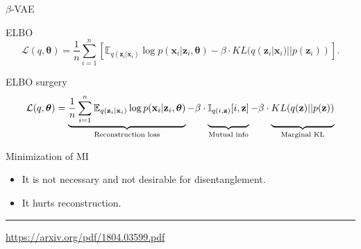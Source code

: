 \documentclass{beamer}
\newcommand{\bx}{\mathbf{x}}
\newcommand{\bz}{\mathbf{z}}
\newcommand{\btheta}{\boldsymbol{\theta}}
\begin{document}
\begin{frame}{$\beta$-VAE}
	\begin{block}{ELBO}
		\vspace{-0.3cm}
		\[
		\mathcal{L}(q, \btheta) = \frac{1}{n} \sum_{i=1}^n \left[ \mathbb{E}_{q(\bz_i | \bx_i)} \log p(\bx_i | \bz_i, \btheta) - \beta \cdot KL(q(\bz_i | \bx_i) || p(\bz_i)) \right].
		\]
		\vspace{-0.3cm}
	\end{block}
	\begin{block}{ELBO surgery}
		\vspace{-0.3cm}
		{\footnotesize
			\[
			\mathcal{L}(q, \btheta) = \underbrace{\frac{1}{n} \sum_{i=1}^n \mathbb{E}_{q(\bz_i | \bx_i)} \log p(\bx_i | \bz_i, \btheta)}_{\text{Reconstruction loss}} - \beta \cdot \underbrace{\mathbb{I}_{q(i, \bz)} [i, \bz]\vphantom{\sum_{i=1}}}_{\text{Mutual info}} - \beta \cdot \underbrace{KL(q(\bz) || p(\bz))\vphantom{\sum_{i=1}}}_{\text{Marginal KL}}
			\]}
	\end{block}
	\begin{block}{Minimization of MI}
	\begin{itemize}
		\item It is not necessary and not desirable for disentanglement. 
		\item It hurts reconstruction.
	\end{itemize}
	\end{block}
	\vfill
	\hrule\medskip
	{\scriptsize \href{https://arxiv.org/pdf/1804.03599.pdf}{https://arxiv.org/pdf/1804.03599.pdf}}
\end{frame}
\end{document}
